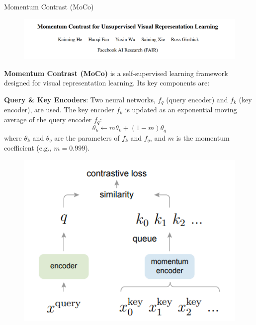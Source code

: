 \begin{frame}[allowframebreaks]{Momentum Contrast (MoCo)}
    \begin{figure}
        \centering
        \includegraphics[width=1\linewidth,height=0.9\textheight,keepaspectratio]{images/ssl/slide_65_1_img.png}
    \end{figure}

    \framebreak

    \textbf{Momentum Contrast (MoCo)} is a self-supervised learning framework designed for visual representation learning. Its key components are:

    \vspace{0.5em}

    \textbf{Query \& Key Encoders}: Two neural networks, $f_q$ (query encoder) and $f_k$ (key encoder), are used. The key encoder $f_k$ is updated as an exponential moving average of the query encoder $f_q$:
        \[
            \theta_k \leftarrow m \theta_k + (1 - m) \theta_q
        \]
        where $\theta_k$ and $\theta_q$ are the parameters of $f_k$ and $f_q$, and $m$ is the momentum coefficient (e.g., $m=0.999$).
    
    \framebreak

    \begin{figure}
        \centering
        \includegraphics[width=1\linewidth,height=0.9\textheight,keepaspectratio]{images/ssl/slide_66_1_img.png}
    \end{figure}


\end{frame}

